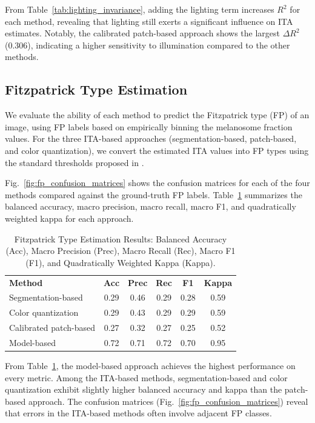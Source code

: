 \documentclass[a4paper,conference]{IEEEtran}
\begin{document}
\noindent
From Table~\ref{tab:lighting_invariance}, adding the lighting term increases \(R^2\) for each method, revealing that lighting still exerts a significant influence on ITA estimates. Notably, the calibrated patch-based approach shows the largest \(\Delta R^2\) (0.306), indicating a higher sensitivity to illumination compared to the other methods.

\subsection{Fitzpatrick Type Estimation}

We evaluate the ability of each method to predict the Fitzpatrick type (FP) of an image, using FP labels based on empirically binning the melanosome fraction values. For the three ITA-based approaches (segmentation-based, 
patch-based, and color quantization), we convert the estimated ITA values into FP types using the standard thresholds proposed 
in \cite{kinyanjuiEstimatingSkinTone2019}.

Fig.~\ref{fig:fp_confusion_matrices} shows the confusion matrices for each of the four methods compared against the 
ground-truth FP labels. Table~\ref{tab:fp_estimation_results} summarizes the balanced accuracy, macro precision, macro recall, macro F1, 
and quadratically weighted kappa for each approach.

\begin{table}[h!]
    \centering
    \caption{Fitzpatrick Type Estimation Results: Balanced Accuracy (Acc), Macro Precision (Prec), Macro Recall (Rec), 
    Macro F1 (F1), and Quadratically Weighted Kappa (Kappa).}
    \label{tab:fp_estimation_results}
    \begin{tabular}{lccccc}
    \textbf{Method} & \textbf{Acc} & \textbf{Prec} & \textbf{Rec} & \textbf{F1} & \textbf{Kappa} \\
    Segmentation-based & 0.29 & 0.46 & 0.29 & 0.28 & 0.59 \\
    Color quantization & 0.29 & 0.43 & 0.29 & 0.29 & 0.59 \\
    Calibrated patch-based & 0.27 & 0.32 & 0.27 & 0.25 & 0.52 \\
    Model-based & 0.72 & 0.71 & 0.72 & 0.70 & 0.95 \\
    \end{tabular}
\end{table}

\noindent
From Table~\ref{tab:fp_estimation_results}, the model-based approach achieves the highest performance on every 
metric. Among the ITA-based methods, segmentation-based and 
color quantization exhibit slightly higher balanced accuracy and kappa than the patch-based approach. The confusion matrices (Fig.~\ref{fig:fp_confusion_matrices}) reveal that errors in the ITA-based 
methods often involve adjacent FP classes.
\end{document}
